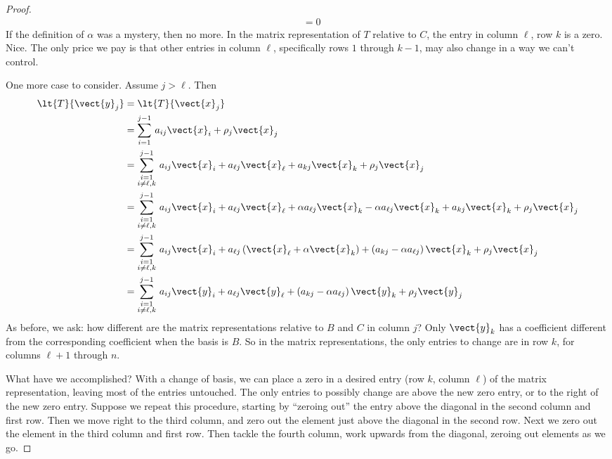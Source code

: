 \begin{proof}
\begin{align*}
&=0
\end{align*}
%
If the definition of $\alpha$ was a mystery, then no more.  In the matrix representation of $T$ relative to $C$, the entry in column $\ell$, row $k$ is a zero.  Nice.  The only price we pay is that other entries in column $\ell$, specifically rows $1$ through $k-1$, may also change in a way we can't control.\par
%
One more case to consider.  Assume $j>\ell$.  Then 
%
\begin{align*}
\lt{T}{\vect{y}_j}
&=\lt{T}{\vect{x}_j}\\
%
&=\sum_{i=1}^{j-1}\,a_{ij}\vect{x}_i + \rho_j\vect{x}_j\\
%
&=\sum_{\substack{i=1\\i\neq\ell,k}}^{j-1}\,a_{ij}\vect{x}_i + a_{\ell j}\vect{x}_\ell+ a_{kj}\vect{x}_k + \rho_j\vect{x}_j\\
%
&=\sum_{\substack{i=1\\i\neq\ell,k}}^{j-1}\,a_{ij}\vect{x}_i+  
a_{\ell j}\vect{x}_\ell + \alpha a_{\ell j}\vect{x}_k - \alpha a_{\ell j}\vect{x}_k+ a_{kj}\vect{x}_k  + \rho_j\vect{x}_j\\
%
&=\sum_{\substack{i=1\\i\neq\ell,k}}^{j-1}\,a_{ij}\vect{x}_i+  
a_{\ell j}\left(\vect{x}_\ell + \alpha\vect{x}_k\right)+
\left(a_{kj}-\alpha a_{\ell j}\right)\vect{x}_k  + \rho_j\vect{x}_j\\
%
&=\sum_{\substack{i=1\\i\neq\ell,k}}^{j-1}\,a_{ij}\vect{y}_i+
a_{\ell j}\vect{y}_\ell+
\left(a_{kj}-\alpha a_{\ell j}\right)\vect{y}_k  + \rho_j\vect{y}_j
%
\end{align*}
%
As before, we ask: how different are the matrix representations relative to $B$ and $C$ in column $j$?  Only $\vect{y}_k$ has a coefficient different from the corresponding coefficient when the basis is $B$.  So in the matrix representations, the only entries to change are in row $k$, for columns $\ell+1$ through $n$.\par
%
What have we accomplished?  With a change of basis, we can place a zero in a desired entry (row $k$, column $\ell$) of the matrix representation, leaving most of the entries untouched.  The only entries to possibly change are above the new zero entry, or to the right of the new zero entry.  Suppose we repeat this procedure, starting by ``zeroing out'' the entry above the diagonal in the second column and first row.  Then we move right to the third column, and zero out the element just above the diagonal in the second row.  Next we zero out the element in the third column and first row.  Then tackle the fourth column, work upwards from the diagonal, zeroing out elements as we go. 

\end{proof}
